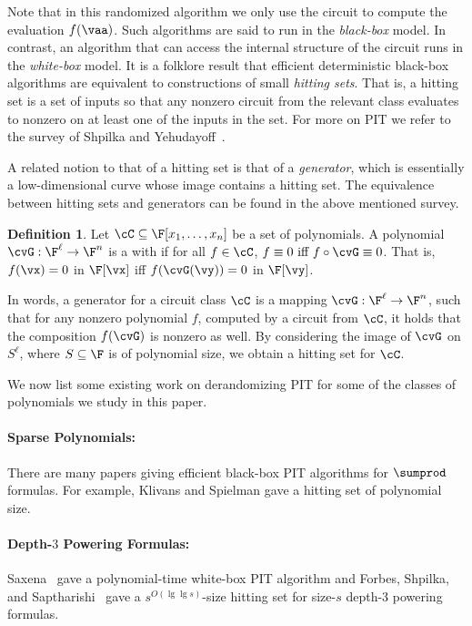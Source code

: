 \documentclass[11pt]{article}
\numberwithin{equation}{section}
\theoremstyle{definition}
\newtheorem{definition}[theorem]{Definition}
\theoremstyle{plain}
\begin{document}
Note that in
this randomized algorithm   %
we only use the circuit to compute the evaluation $f(\vaa)$.  Such algorithms are said to run in the \emph{black-box} model. In contrast, an algorithm that can access the internal structure of the circuit runs in the \emph{white-box} model. It is a folklore result that efficient deterministic black-box algorithms are equivalent to constructions of small \emph{hitting sets}. That is, a hitting set is a set of inputs so that any nonzero circuit from the relevant class evaluates to nonzero on at least one of the inputs in the set. For more on PIT we refer to the survey of Shpilka and Yehudayoff~\cite{SY10}.

A related notion to that of a hitting set is that of a \emph{generator}, which is essentially a low-dimensional curve whose image contains a hitting set.  The equivalence between hitting sets and generators can be found in the above mentioned survey.

\begin{definition}\label{defn:generator}
        Let $\cC\subseteq\F[x_1,\ldots,x_n]$ be a set of polynomials.  A polynomial $\cvG:\F^\ell\to\F^n$ is a  with  if for all $f\in\cC$,
        $f\equiv 0 \text{ iff } f\circ \cvG\equiv 0$. That is, $f(\vx)=0$ in $\F[\vx]$ iff $f(\cvG(\vy))=0$ in $\F[\vy]$.
\end{definition}

In words, a generator for a circuit class $\cC$ is a mapping $\cvG:\F^\ell \to \F^n$, such that for any nonzero polynomial $f$, computed by a circuit from $\cC$, it holds that the composition $f(\cvG)$ is nonzero as well. By considering the image of $\cvG$ on $S^\ell$, where $S \subseteq \F$ is of polynomial size, we obtain a hitting set for $\cC$.

We now list some existing work on derandomizing PIT for some of the classes of polynomials we study in this paper.

\paragraph{Sparse Polynomials:} There are many papers giving efficient black-box PIT algorithms for $\sumprod$ formulas. For example, Klivans and Spielman \cite{KlivansSpielman01} gave a hitting set of polynomial size.

\paragraph{Depth-$3$ Powering Formulas:} Saxena~\cite{Saxena08} gave a
%
polynomial-time   %
white-box PIT algorithm and  Forbes, Shpilka, and Saptharishi~\cite{ForbesSS14} gave a $s^{O(\lg\lg s)}$-size hitting set for size-$s$ depth-$3$ powering formulas.
\end{document}
